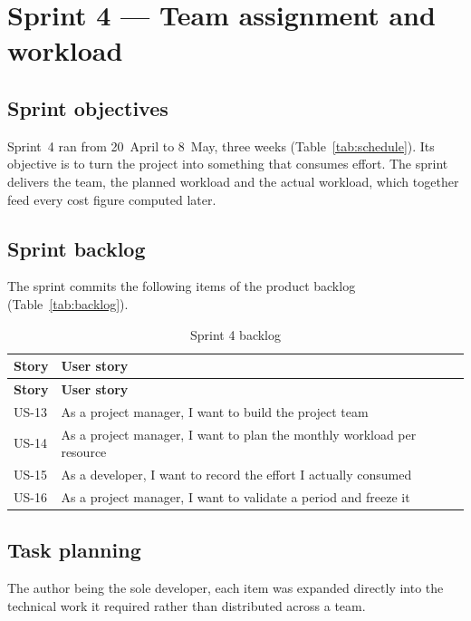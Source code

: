 \section{Sprint 4 --- Team assignment and workload}

\subsection{Sprint objectives}
Sprint~4 ran from 20~April to 8~May, three weeks (Table~\ref{tab:schedule}). Its objective is to
turn the project into something that consumes effort. The sprint delivers the team, the planned
workload and the actual workload, which together feed every cost figure computed later.

\subsection{Sprint backlog}
The sprint commits the following items of the product backlog (Table~\ref{tab:backlog}).

\begin{longtable}{|m{1.6cm}|m{12.4cm}|}
\caption{Sprint 4 backlog}\label{tab:sb4}\\
\hline
\textbf{Story} & \textbf{User story} \\
\hline
\endfirsthead
\hline
\textbf{Story} & \textbf{User story} \\
\hline
\endhead
\endfoot
\endlastfoot
\hline
US-13 & As a project manager, I want to build the project team \\
\hline
US-14 & As a project manager, I want to plan the monthly workload per resource \\
\hline
US-15 & As a developer, I want to record the effort I actually consumed \\
\hline
US-16 & As a project manager, I want to validate a period and freeze it \\
\hline
\end{longtable}

\subsection{Task planning}
The author being the sole developer, each item was expanded directly into the technical work it
required rather than distributed across a team.

